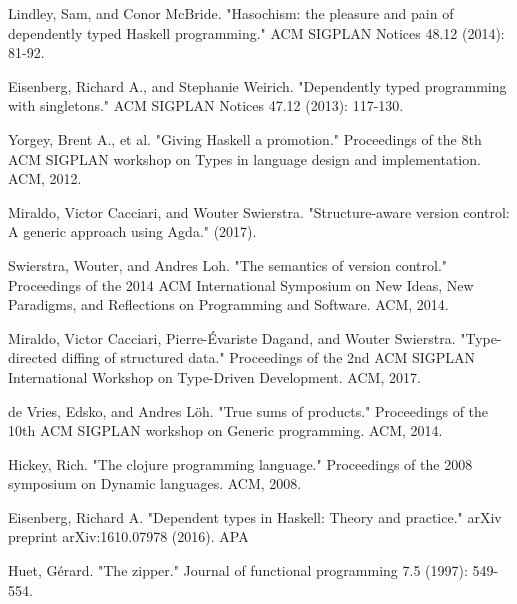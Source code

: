 \documentclass[11pt, titlepage]{article}
\begin{document}
%



\begin{thebibliography}{30}  
  Lindley, Sam, and Conor McBride. "Hasochism: the pleasure and pain of dependently typed Haskell programming." ACM SIGPLAN Notices 48.12 (2014): 81-92.

 Eisenberg, Richard A., and Stephanie Weirich. "Dependently typed programming with singletons." ACM SIGPLAN Notices 47.12 (2013): 117-130.
  
 Yorgey, Brent A., et al. "Giving Haskell a promotion." Proceedings of the 8th ACM SIGPLAN workshop on Types in language design and implementation. ACM, 2012.
  
   Miraldo, Victor Cacciari, and Wouter Swierstra. "Structure-aware version control: A generic approach using Agda." (2017).

   Swierstra, Wouter, and Andres Loh. "The semantics of version control." Proceedings of the 2014 ACM International Symposium on New Ideas, New Paradigms, and Reflections on Programming and Software. ACM, 2014.

  Miraldo, Victor Cacciari, Pierre-Évariste Dagand, and Wouter Swierstra. "Type-directed diffing of structured data." Proceedings of the 2nd ACM SIGPLAN International Workshop on Type-Driven Development. ACM, 2017.
  
  de Vries, Edsko, and Andres Löh. "True sums of products." Proceedings of the 10th ACM SIGPLAN workshop on Generic programming. ACM, 2014.
  
Hickey, Rich. "The clojure programming language." Proceedings of the 2008 symposium on Dynamic languages. ACM, 2008.

 Eisenberg, Richard A. "Dependent types in Haskell: Theory and practice." arXiv preprint arXiv:1610.07978 (2016). APA	

 Huet, Gérard. "The zipper." Journal of functional programming 7.5 (1997): 549-554.


\end{thebibliography}
\end{document}
